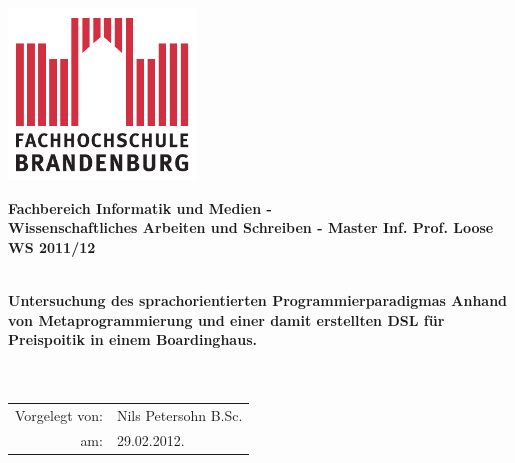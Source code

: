 \titlepage

\begin{center}
\includegraphics[width=5cm]{pics/FH-Logo}\vspace{0.5cm}

\par\end{center}

\noindent \begin{center}
\textsf{\textbf{\Large Fachbereich Informatik und Medien - \\
Wissenschaftliches Arbeiten und Schreiben - Master Inf. Prof. Loose
WS 2011/12}}\\ \textsf{\large }\\
\vspace{1cm}

\par\end{center}

\begin{center}
\textsf{\textbf{\huge Untersuchung des sprachorientierten
Programmierparadigmas Anhand von Metaprogrammierung und einer damit
erstellten DSL für Preispoitik in einem Boardinghaus.\\
}}\textsf{}\\ \textsf{}\\ 

\par\end{center}{\Large \par}

\vspace{2cm}


\noindent \begin{center}
{\huge }\begin{tabular}{rl}
Vorgelegt von: & Nils Petersohn B.Sc. \tabularnewline am: &
29.02.2012.\tabularnewline
\end{tabular}
\par\end{center}{\huge \par}

